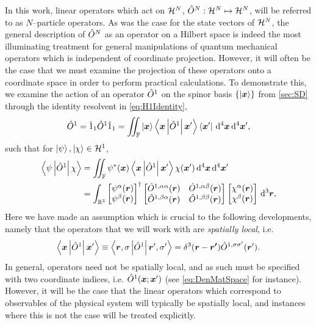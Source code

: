 In this work, linear operators which act on $\mathcal{H}^N$, $\hat{O}^N : \mathcal{H}^N \mapsto \mathcal{H}^N$, will be referred to as 
$N$--particle operators. As was the case for the state vectors of $\mathcal{H}^N$, the general description of $\hat{O}^N$
as an operator on a Hilbert space is indeed the most illuminating treatment for general manipulations of quantum mechanical
operators which is independent of coordinate projection. However, it will often be the case that we must examine the
projection of these operators onto a coordinate space in order to perform practical calculations. To demonstrate this, we examine
the action of an operator $\hat{O}^1$ on the spinor basis $\left \lbrace \left\vert \boldsymbol{x} \right\rangle \right\rbrace$ from \cref{sec:SD} through the identity resolvent in
\cref{eq:H1Identity},
\begin{align}
  \hat{O}^1 = \hat{1}_1 \hat{O}^1 \hat{1}_1 = \int\mkern-12mu\int_{\mathbb F} 
    \left\vert \boldsymbol{x} \right\rangle \left\langle \boldsymbol{x} \left\vert \hat{O}^1 \right\vert \boldsymbol{x}' \right\rangle\left\langle \boldsymbol{x}' \right\vert \,\mathrm{d}^4\boldsymbol{x} \,\mathrm{d}^4\boldsymbol{x}',
\end{align}
such that for $\left\vert \psi \right\rangle,\left\vert \chi \right\rangle \in \mathcal{H}^1$,
\begin{align}
  \label{eq:SpinorOpInner1}
  \left\langle \psi \left\vert \hat{O}^1 \right\vert \chi \right\rangle &= \int\mkern-12mu\int_{\mathbb F}
    \psi^*(\boldsymbol{x}) \left\langle \boldsymbol{x} \left\vert \hat{O}^1 \right\vert \boldsymbol{x}' \right\rangle \chi({\boldsymbol{x}'}) \,\mathrm{d}^4\boldsymbol{x} \,\mathrm{d}^4\boldsymbol{x}' \nonumber \\
  &= \int_{\mathbb R^3} 
    \begin{bmatrix}
      \psi^\alpha(\boldsymbol{r}) \\
      \psi^\beta(\boldsymbol{r})
    \end{bmatrix}^\dagger
    \begin{bmatrix}
      \hat{O}^{1,\alpha\alpha}({\boldsymbol{r}}) & \hat{O}^{1,\alpha\beta}({\boldsymbol{r}}) \\
      \hat{O}^{1,\beta\alpha} ({\boldsymbol{r}}) & \hat{O}^{1,\beta\beta} ({\boldsymbol{r}})
    \end{bmatrix}
    \begin{bmatrix}
      \chi^\alpha(\boldsymbol{r}) \\
      \chi^\beta(\boldsymbol{r})
    \end{bmatrix} \,\mathrm{d}^3\boldsymbol{r},
\end{align}
Here we have made an assumption which is crucial to the following developments, namely that the operators that we will work with
are \emph{spatially local}, i.e.
\begin{equation}
  \label{eq:LocalSpinorOp1}
\left\langle \boldsymbol{x} \left\vert \hat{O}^1 \right\vert \boldsymbol{x}' \right\rangle  \equiv \left\langle \boldsymbol{r},\sigma \left\vert \hat{O}^1 \right\vert \boldsymbol{r}',\sigma' \right\rangle = \delta^3(\boldsymbol{r} - \boldsymbol{r'}) \hat{O}^{1,\sigma\sigma'}(\boldsymbol{r}').
\end{equation}
In general, operators need not be spatially local, and as such must be specified with two coordinate indices, i.e. $\hat{O}^1(\boldsymbol{x};\boldsymbol{x}')$
(see \cref{eq:DenMatSpace} for instance).
However, it will be the case that the linear operators which correspond to observables of the physical system will typically be spatially local,
and instances where this is not the case will be treated explicitly. 


